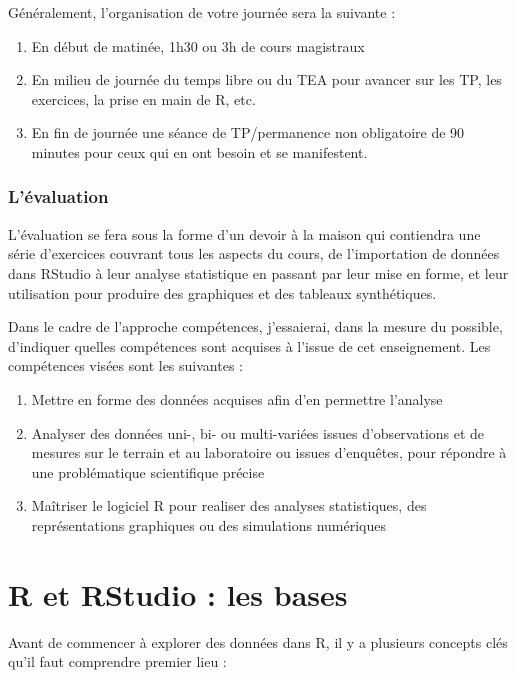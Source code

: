 \documentclass[a4paperpaper,]{article}
\providecommand{\tightlist}{%
  \setlength{\itemsep}{0pt}\setlength{\parskip}{0pt}}
\theoremstyle{definition}
\theoremstyle{definition}
\theoremstyle{definition}
\theoremstyle{remark}
\begin{document}
Généralement, l'organisation de votre journée sera la suivante :

\begin{enumerate}
\def\labelenumi{\arabic{enumi}.}
\tightlist
\item
  En début de matinée, 1h30 ou 3h de cours magistraux
\item
  En milieu de journée du temps libre ou du TEA pour avancer sur les TP,
  les exercices, la prise en main de R, etc.
\item
  En fin de journée une séance de TP/permanence non obligatoire de 90
  minutes pour ceux qui en ont besoin et se manifestent.
\end{enumerate}

\subsubsection{L'évaluation}\label{levaluation}

L'évaluation se fera sous la forme d'un devoir à la maison qui
contiendra une série d'exercices couvrant tous les aspects du cours, de
l'importation de données dans RStudio à leur analyse statistique en
passant par leur mise en forme, et leur utilisation pour produire des
graphiques et des tableaux synthétiques.

Dans le cadre de l'approche compétences, j'essaierai, dans la mesure du
possible, d'indiquer quelles compétences sont acquises à l'issue de cet
enseignement. Les compétences visées sont les suivantes :

\begin{enumerate}
\def\labelenumi{\arabic{enumi}.}
\tightlist
\item
  Mettre en forme des données acquises afin d'en permettre l'analyse
\item
  Analyser des données uni-, bi- ou multi-variées issues d'observations
  et de mesures sur le terrain et au laboratoire ou issues d'enquêtes,
  pour répondre à une problématique scientifique précise
\item
  Maîtriser le logiciel R pour realiser des analyses statistiques, des
  représentations graphiques ou des simulations numériques
\end{enumerate}

\section{R et RStudio : les bases}\label{bases}

Avant de commencer à explorer des données dans R, il y a plusieurs
concepts clés qu'il faut comprendre premier lieu :
\end{document}
